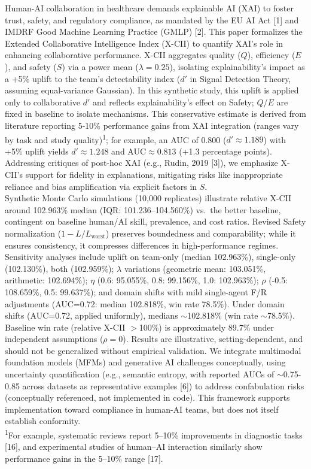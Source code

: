 \documentclass[a4paper]{article}
\begin{document}
Human-AI collaboration in healthcare demands explainable AI (XAI) to
foster trust, safety, and regulatory compliance, as mandated by the EU
AI Act {[}1{]} and IMDRF Good Machine Learning Practice (GMLP) {[}2{]}.
This paper formalizes the Extended Collaborative Intelligence Index
(X-CII) to quantify XAI's role in enhancing collaborative performance.
X-CII aggregates quality ($Q$), efficiency ($E$), and safety ($S$) via a power
mean ($\lambda=0.25$), isolating explainability's impact as a +5\% uplift to the
team's detectability index ($d'$ in Signal Detection Theory, assuming
equal-variance Gaussian). In this synthetic study, this uplift is
applied only to collaborative $d'$ and reflects explainability's effect on
Safety; $Q$/$E$ are fixed in baseline to isolate mechanisms. This
conservative estimate is derived from literature reporting 5-10\%
performance gains from XAI integration (ranges vary by task and study
quality)\textsuperscript{1}; for example, an AUC of 0.800 ($d'\approx1.189$) with +5\% uplift
yields $d'\approx1.248$ and AUC$\approx0.813$ (+1.3 percentage points). Addressing
critiques of post-hoc XAI (e.g., Rudin, 2019 {[}3{]}), we emphasize
X-CII's support for fidelity in explanations, mitigating risks like
inappropriate reliance and bias amplification via explicit factors in
$S$.\\
Synthetic Monte Carlo simulations (10,000 replicates) illustrate
relative X-CII around 102.963\% median (IQR: 101.236--104.560\%) vs.~the
better baseline, contingent on baseline human/AI skill, prevalence, and
cost ratios. Revised Safety normalization ($1 - L / L_{\text{worst}}$) preserves
boundedness and comparability; while it ensures consistency, it
compresses differences in high-performance regimes. Sensitivity analyses
include uplift on team-only (median 102.963\%), single-only (102.130\%),
both (102.959\%); $\lambda$ variations (geometric mean: 103.051\%, arithmetic:
102.694\%); $\eta$ (0.6: 95.055\%, 0.8: 99.156\%, 1.0: 102.963\%); $\rho$ (-0.5:
108.659\%, 0.5: 99.637\%); and domain shifts with mild single-agent F/R
adjustments (AUC=0.72: median 102.818\%, win rate 78.5\%). Under domain
shifts (AUC=0.72, applied uniformly), medians $\sim$102.818\%
(win rate $\sim$78.5\%). Baseline win rate (relative X-CII
$>$100\%) is approximately 89.7\% under independent assumptions
($\rho=0$). Results are illustrative, setting-dependent, and should not be
generalized without empirical validation. We integrate multimodal
foundation models (MFMs) and generative AI challenges conceptually,
using uncertainty quantification (e.g., semantic entropy, with reported
AUCs of $\sim$0.75-0.85 across datasets as representative
examples {[}6{]}) to address confabulation risks (conceptually
referenced, not implemented in code). This framework supports
implementation toward compliance in human-AI teams, but does not itself
establish conformity.\\
\textsuperscript{1}For example, systematic reviews report 5--10\% improvements in
diagnostic tasks {[}16{]}, and experimental studies of human--AI
interaction similarly show performance gains in the 5--10\% range
{[}17{]}.
\end{document}
